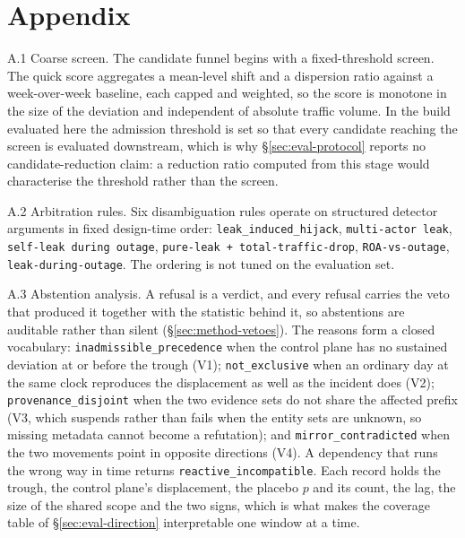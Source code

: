 \section*{Appendix}

A.1 Coarse screen.  The candidate funnel begins with a fixed-threshold
screen. The quick score aggregates a mean-level shift and a dispersion
ratio against a week-over-week baseline, each capped and weighted, so
the score is monotone in the size of the deviation and independent of
absolute traffic volume. In the build evaluated here the admission
threshold is set so that every candidate reaching the screen is
evaluated downstream, which is why \S\ref{sec:eval-protocol} reports no
candidate-reduction claim: a reduction ratio computed from this stage
would characterise the threshold rather than the screen.
\label{app:regularity}

A.2 Arbitration rules.  Six disambiguation rules operate
on structured detector arguments in fixed design-time
order: \texttt{leak\_induced\_hijack}, \texttt{multi-actor
leak}, \texttt{self-leak during outage},
\texttt{pure-leak + total-traffic-drop},
\texttt{ROA-vs-outage}, \texttt{leak-during-outage}.
The ordering is not tuned on the evaluation set.
\label{app:arbitration}

A.3 Abstention analysis.  A refusal is a verdict, and every refusal
carries the veto that produced it together with the statistic behind it,
so abstentions are auditable rather than silent
(\S\ref{sec:method-vetoes}). The reasons form a closed vocabulary:
\texttt{inadmissible\_precedence} when the control plane has no
sustained deviation at or before the trough (V1);
\texttt{not\_exclusive} when an ordinary day at the same clock
reproduces the displacement as
well as the incident does (V2); \texttt{provenance\_disjoint} when the
two evidence sets do not share the affected prefix (V3, which suspends
rather than fails when the entity sets are unknown, so missing metadata
cannot become a refutation); and \texttt{mirror\_contradicted} when the
two movements point in opposite directions (V4). A
dependency that runs the wrong way in time returns
\texttt{reactive\_incompatible}. Each record holds the trough, the
control plane's displacement, the placebo $p$ and its count, the lag,
the size of the shared scope and the two signs, which is what
makes the coverage table of \S\ref{sec:eval-direction} interpretable one
window at a time.

